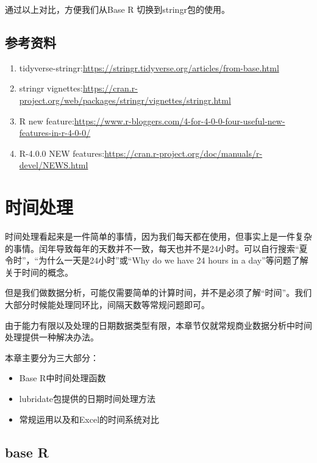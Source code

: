 \documentclass[
]{book}
\providecommand{\tightlist}{%
  \setlength{\itemsep}{0pt}\setlength{\parskip}{0pt}}
\begin{document}
通过以上对比，方便我们从Base R 切换到stringr包的使用。

\hypertarget{character:reference-material}{%
\section{参考资料}\label{character:reference-material}}

\begin{enumerate}
\def\labelenumi{\arabic{enumi}.}
\tightlist
\item
  tidyverse-stringr:\url{https://stringr.tidyverse.org/articles/from-base.html}
\item
  stringr vignettes:\url{https://cran.r-project.org/web/packages/stringr/vignettes/stringr.html}
\item
  R new feature:\url{https://www.r-bloggers.com/4-for-4-0-0-four-useful-new-features-in-r-4-0-0/}
\item
  R-4.0.0 NEW features:\url{https://cran.r-project.org/doc/manuals/r-devel/NEWS.html}
\end{enumerate}

\hypertarget{datetime}{%
\chapter{时间处理}\label{datetime}}

时间处理看起来是一件简单的事情，因为我们每天都在使用，但事实上是一件复杂的事情。闰年导致每年的天数并不一致，每天也并不是24小时。可以自行搜索``夏令时''，``为什么一天是24小时''或``Why do we have 24 hours in a day''等问题了解关于时间的概念。

但是我们做数据分析，可能仅需要简单的计算时间，并不是必须了解``时间''。我们大部分时候能处理同环比，间隔天数等常规问题即可。

由于能力有限以及处理的日期数据类型有限，本章节仅就常规商业数据分析中时间处理提供一种解决办法。

本章主要分为三大部分：

\begin{itemize}
\item
  Base R中时间处理函数
\item
  lubridate包提供的日期时间处理方法
\item
  常规运用以及和Excel的时间系统对比
\end{itemize}

\hypertarget{datetime:base-R}{%
\section{base R}\label{datetime:base-R}}
\end{document}
